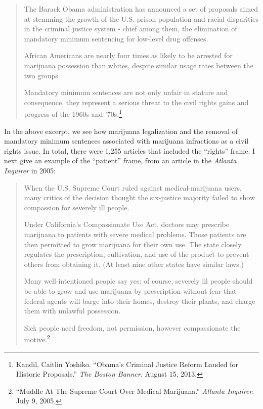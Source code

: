 \begin{quotation}
\begin{singlespace}
\noindent The Barack Obama administration has announced a set of proposals aimed at stemming the growth of the U.S. prison population and racial disparities in the criminal justice system - chief among them, the elimination of mandatory minimum sentencing for low-level drug offenses.\newline

\noindent African Americans are nearly four times as likely to be arrested for marijuana possession than whites, despite similar usage rates between the two groups.\newline

\noindent Mandatory minimum sentences are not only unfair in stature and consequence, they represent a serious threat to the civil rights gains and progress of the 1960s and '70s.\footnote{Kandil, Caitlin Yoshiko. ``Obama's Criminal Justice Reform Lauded for Historic Proposals.'' \textit{The Boston Banner}. August 15, 2013.}
\end{singlespace}
\end{quotation}

In the above excerpt, we see how marijuana legalization and the removal of mandatory minimum sentences associated with marijuana infractions as a civil rights issue. In total, there were 1,255 articles that included the ``rights'' frame. I next give an example of the ``patient'' frame, from an article in the \textit{Atlanta Inquirer} in 2005:


\begin{quotation}
\begin{singlespace}
\noindent When the U.S. Supreme Court ruled against medical-marijuana users, many critics of the decision thought the six-justice majority failed to show compassion for severely ill people. \newline

\noindent Under California's Compassionate Use Act, doctors may prescribe marijuana to patients with severe medical problems. Those patients are then permitted to grow marijuana for their own use. The state closely regulates the prescription, cultivation, and use of the product to prevent others from obtaining it. (At least nine other states have similar laws.)\newline

\noindent Many well-intentioned people say yes: of course, severely ill people should be able to grow and use marijuana by prescription without fear that federal agents will barge into their homes, destroy their plants, and charge them with unlawful possession.\newline

\noindent Sick people need freedom, not permission, however compassionate the motive.\footnote{``Muddle At The Supreme Court Over Medical Marijuana.'' \textit{Atlanta Inquirer}. July 9, 2005.}
\end{singlespace}
\end{quotation}


